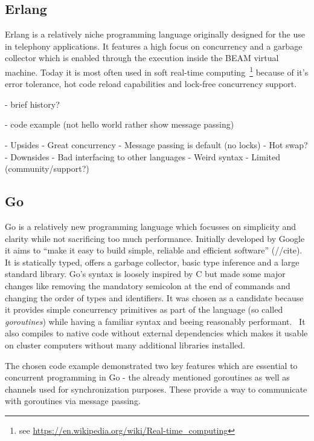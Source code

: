 \subsection*{Erlang}
\label{subsec:State_of_the_art::Candidates::Erlang}
Erlang is a relatively niche programming language originally designed for the use in telephony applications. It features a high focus on concurrency and a garbage collector which is enabled through the execution inside the BEAM virtual machine. Today it is most often used in soft real-time computing~\footnote{see \url{https://en.wikipedia.org/wiki/Real-time_computing}} because of it's error tolerance, hot code reload capabilities and lock-free concurrency support.

- brief history?

- code example (not hello world rather show message passing)

- Upsides
    - Great concurrency
    - Message passing is default (no locks)
    - Hot swap?
- Downsides
    - Bad interfacing to other languages
    - Weird syntax
    - Limited (community/support?)


\subsection*{Go}
\label{subsec:State_of_the_art::Candidates::Go}
Go is a relatively new programming language which focusses on simplicity and clarity while not sacrificing too much performance. Initially developed by Google it aims to ``make it easy to build simple, reliable and efficient software'' (//cite). It is statically typed, offers a garbage collector, basic type inference and a large standard library. Go's syntax is loosely inspired by C but made some major changes like removing the mandatory semicolon at the end of commands and changing the order of types and identifiers. It was chosen as a candidate because it provides simple concurrency primitives as part of the language (so called \textit{goroutines}) while having a familiar syntax and beeing reasonably performant.~\cite{intro_go} It also compiles to native code without external dependencies which makes it usable on cluster computers without many additional libraries installed.

The chosen code example demonstrated two key features which are essential to concurrent programming in Go - the already mentioned goroutines as well as channels used for synchronization purposes. These provide a way to communicate with goroutines via message passing.

